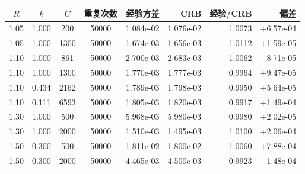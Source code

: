 \begin{tabular}{ccccrrrr}
\toprule
$R$ & $k$ & $C$ & 重复次数 & 经验方差 & CRB & 经验/CRB & 偏差 \\
\midrule
1.05 & 1.000 & 200 & 50000 & 1.084e-02 & 1.076e-02 & 1.0073 & +6.57e-04 \\
1.05 & 1.000 & 1300 & 50000 & 1.674e-03 & 1.656e-03 & 1.0112 & +1.59e-05 \\
1.10 & 1.000 & 861 & 50000 & 2.700e-03 & 2.683e-03 & 1.0062 & -8.71e-05 \\
1.10 & 1.000 & 1300 & 50000 & 1.770e-03 & 1.777e-03 & 0.9964 & +9.47e-05 \\
1.10 & 0.434 & 2162 & 50000 & 1.789e-03 & 1.798e-03 & 0.9950 & +5.64e-05 \\
1.10 & 0.111 & 6593 & 50000 & 1.805e-03 & 1.820e-03 & 0.9917 & +1.49e-04 \\
1.30 & 1.000 & 500 & 50000 & 5.968e-03 & 5.980e-03 & 0.9980 & +2.02e-05 \\
1.30 & 1.000 & 2000 & 50000 & 1.510e-03 & 1.495e-03 & 1.0100 & +2.06e-04 \\
1.50 & 0.300 & 500 & 50000 & 1.811e-02 & 1.800e-02 & 1.0060 & +7.88e-04 \\
1.50 & 0.300 & 2000 & 50000 & 4.465e-03 & 4.500e-03 & 0.9923 & -1.48e-04 \\
\bottomrule
\end{tabular}
